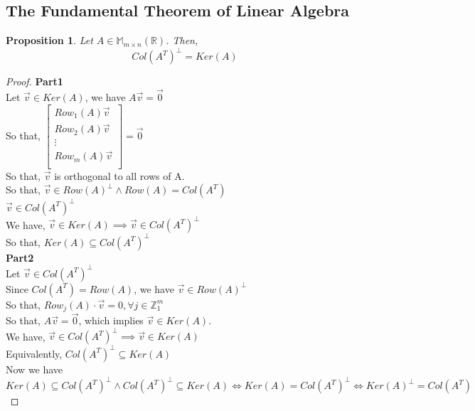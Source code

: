 \documentclass[11pt]{article}
\newtheorem{proposition}{Proposition}
\newcommand{\ma}[2]{\mathbb{M}_{#1 \times #2}}
\begin{document}
	\subsection{The Fundamental Theorem of Linear Algebra}
	\begin{proposition}
		Let $A \in \ma{m}{n}(\mathbb{R})$. Then,
		\[
			Col(A^T)^\perp = Ker(A)
		\]
	\end{proposition}
	\begin{proof}
		\textbf{Part1}\\
		
		Let $\vec{v} \in Ker(A)$, we have $A\vec{v} = \vec{0}$ \\
		
		So that, $\begin{bmatrix}
				Row_1(A) \vec{v} \\
				Row_2(A) \vec{v} \\
				\vdots \\
				Row_m(A) \vec{v} \\
			\end{bmatrix} = \vec{0}$ \\
		
		So that, $\vec{v}$ is orthogonal to all rows of A. \\
		
		So that, $\vec{v} \in Row(A)^\perp \land Row(A) = Col(A^T)$ \\
		
		$\vec{v} \in Col(A^T)^\perp$\\
		
		We have, $\vec{v} \in Ker(A) \implies \vec{v} \in Col(A^T)^\perp$ \\
		
		So that, $Ker(A) \subseteq Col(A^T)^\perp$ \\
		
		\textbf{Part2}\\
		
		Let $\vec{v} \in Col(A^T)^\perp$ \\
		
		Since $Col(A^T) = Row(A)$, we have $\vec{v} \in Row(A)^\perp$ \\
		
		So that, $Row_j(A) \cdot \vec{v} = 0, \forall j \in \mathbb{Z}_1^m$ \\
		
		So that, $A\vec{v} = \vec{0}$, which implies $\vec{v} \in Ker(A)$. \\
		
		We have, $\vec{v} \in Col(A^T)^\perp \implies \vec{v} \in Ker(A) $ \\
		
		Equivalently, $Col(A^T)^\perp \subseteq Ker(A)$ \\
		
		Now we have $Ker(A) \subseteq Col(A^T)^\perp \land Col(A^T)^\perp \subseteq Ker(A) \iff Ker(A) = Col(A^T)^\perp \iff Ker(A)^\perp = Col(A^T)$\\
	\end{proof}
	
\end{document}
